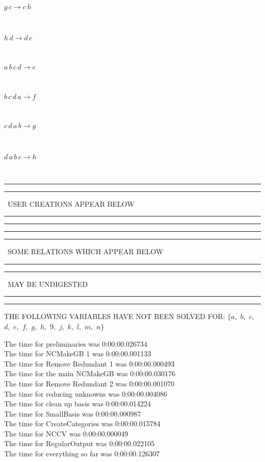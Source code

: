 \documentclass[rep10,leqno]{report}
\begin{document}
\begin{minipage}{6in}
$
g\,
 c\rightarrow c\,
 h
$
\end{minipage}\medskip \\
\begin{minipage}{6in}
$
h\,
 d\rightarrow d\,
 e
$
\end{minipage}\medskip \\
\begin{minipage}{6in}
$
a\,
 b\,
 c\,
 d\rightarrow e
$
\end{minipage}\medskip \\
\begin{minipage}{6in}
$
b\,
 c\,
 d\,
 a\rightarrow f
$
\end{minipage}\medskip \\
\begin{minipage}{6in}
$
c\,
 d\,
 a\,
 b\rightarrow g
$
\end{minipage}\medskip \\
\begin{minipage}{6in}
$
d\,
 a\,
 b\,
 c\rightarrow h
$
\end{minipage}\\
\rule[2pt]{6in}{1pt}\hfil\break
\rule[2.5pt]{1.701in}{1pt}
\ USER CREATIONS APPEAR BELOW\ 
\rule[2.5pt]{1.701in}{1pt}\hfil\break
\rule[2pt]{6in}{1pt}\hfil\break
\rule[2pt]{6in}{4pt}\hfil\break
\rule[2pt]{1.45in}{4pt}
\ SOME RELATIONS WHICH APPEAR BELOW\ 
\rule[2pt]{1.45in}{4pt}\hfil\break
\rule[2pt]{2.18in}{4pt}
\ MAY BE UNDIGESTED\ 
\rule[2pt]{2.18in}{4pt}\hfil\break
\rule[2pt]{6in}{4pt}\hfil\break
THE FOLLOWING VARIABLES HAVE NOT BEEN SOLVED FOR:\hfil\break
$\{a,
$ $
b,
$ $
c,
$ $
d,
$ $
e,
$ $
f,
$ $
g,
$ $
h,
$ $
9,
$ $
j,
$ $
k,
$ $
l,
$ $
m,
$ $
n\}$
\smallskip\\
\vspace{10pt}

\noindent
The time for preliminaries was 0:00:00.026734\\
The time for NCMakeGB 1 was 0:00:00.001133\\
The time for Remove Redundant 1 was 0:00:00.000493\\
The time for the main NCMakeGB was 0:00:00.030176\\
The time for Remove Redundant 2 was 0:00:00.001070\\
The time for reducing unknowns was 0:00:00.004086\\
The time for clean up basis was 0:00:00.014224\\
The time for SmallBasis was 0:00:00.000987\\
The time for CreateCategories was 0:00:00.015784\\
The time for NCCV was 0:00:00.000049\\
The time for RegularOutput was 0:00:00.022105\\
The time for everything so far was 0:00:00.126307\\
\end{document}
